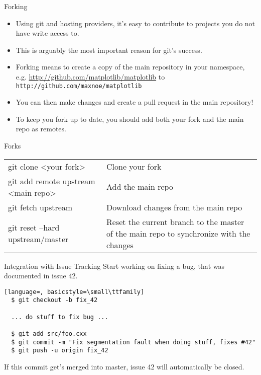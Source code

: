 \begin{frame}[t]{Forking}
  \begin{itemize}
    \item Using git and hosting providers, it's easy to contribute to projects you do not have write access to.

    \item This is arguably the most important reason for git's success.

    \item Forking means to create a copy of the main repository in your namespace, e.g. \url{http://github.com/matplotlib/matplotlib} to \texttt{http://github.com/maxnoe/matplotlib}

    \item You can then make changes and create a pull request in the main repository!

    \item To keep you fork up to date, you should add both your fork and the main repo as remotes.
  \end{itemize}
\end{frame}

\begin{frame}{Forks}
  \begin{tabu}{>{\ttfamily}l X[,L]}
    git clone <your fork>  & Clone your fork \\
    git add remote upstream <main repo>   & Add the main repo \\
    git fetch upstream   & Download changes from the main repo \\
    git reset --hard upstream/master & Reset the current branch to the master of the main repo to synchronize with the changes
  \end{tabu}
\end{frame}

\begin{frame}[c, fragile]{Integration with Issue Tracking}
  Start working on fixing a bug, that was documented in issue 42.

  \begin{lstlisting}[language=, basicstyle=\small\ttfamily]
  $ git checkout -b fix_42

  ... do stuff to fix bug ...

  $ git add src/foo.cxx
  $ git commit -m "Fix segmentation fault when doing stuff, fixes #42" 
  $ git push -u origin fix_42
  \end{lstlisting}

  If this commit get's merged into master, issue 42 will automatically be closed.
  
\end{frame}
